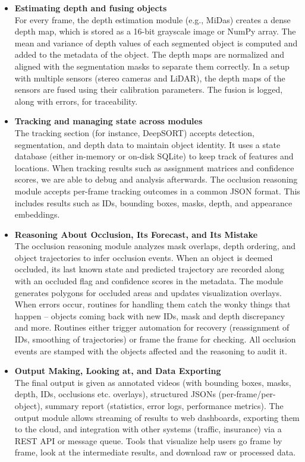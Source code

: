 \documentclass[12pt,a4paper]{report}
\theoremstyle{definition}
\theoremstyle{remark}
\begin{document}
\begin{itemize}
\item \textbf{Estimating depth and fusing objects}\\
For every frame, the depth estimation module (e.g., MiDas) creates a dense depth map, which is stored as a 16-bit grayscale image or NumPy array. The mean and variance of depth values of each segmented object is computed and added to the metadata of the object. The depth maps are normalized and aligned with the segmentation masks to separate them correctly. In a setup with multiple sensors (stereo cameras and LiDAR), the depth maps of the sensors are fused using their calibration parameters. The fusion is logged, along with errors, for traceability.

\item \textbf{Tracking and managing state across modules}\\
The tracking section (for instance, DeepSORT) accepts detection, segmentation, and depth data to maintain object identity. It uses a state database (either in-memory or on-disk SQLite) to keep track of features and locations. When tracking results such as assignment matrices and confidence scores, we are able to debug and analysis afterwards. The occlusion reasoning module accepts per-frame tracking outcomes in a common JSON format. This includes results such as IDs, bounding boxes, masks, depth, and appearance embeddings.

\item \textbf{Reasoning About Occlusion, Its Forecast, and Its Mistake} \\
The occlusion reasoning module analyzes mask overlaps, depth ordering, and object trajectories to infer occlusion events. When an object is deemed occluded, its last known state and predicted trajectory are recorded along with an occluded flag and confidence scores in the metadata. The module generates polygons for occluded areas and updates visualization overlays. When errors occur, routines for handling them catch the wonky things that happen – objects coming back with new IDs, mask and depth discrepancy and more. Routines either trigger automation for recovery (reassignment of IDs, smoothing of trajectories) or frame the frame for checking. All occlusion events are stamped with the objects affected and the reasoning to audit it.

\item \textbf{Output Making, Looking at, and Data Exporting}\\
The final output is given as annotated videos (with bounding boxes, masks, depth, IDs, occlusions etc. overlays), structured JSONs (per-frame/per-object), summary report (statistics, error logs, performance metrics). The output module allows streaming of results to web dashboards, exporting them to the cloud, and integration with other systems (traffic, insurance) via a REST API or message queue. Tools that visualize help users go frame by frame, look at the intermediate results, and download raw or processed data.


\end{itemize}
\end{document}
